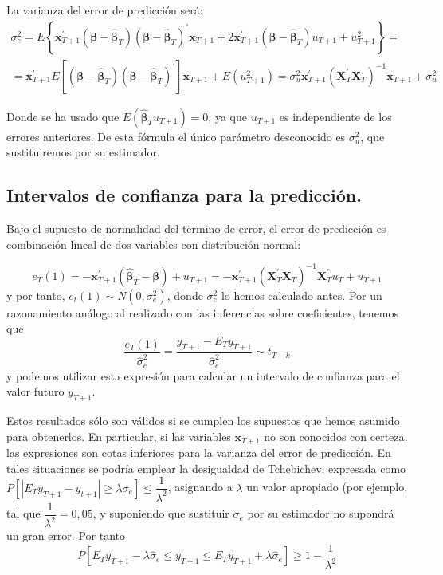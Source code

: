 La varianza del error de predicci\'on ser\'a: 
\[
\begin{array}{c}
\sigma_{e}^{2}=E\left\{ \boldsymbol{x}^{\prime}_{T+1}\left(\boldsymbol{\beta}-\hat{\boldsymbol{\beta}}_{T}\right)\left(\boldsymbol{\beta}-\hat{\boldsymbol{\beta}}_{T}\right)^{\prime}\boldsymbol{x}{}_{T+1}+2\boldsymbol{x}^{\prime}_{T+1}\left(\boldsymbol{\beta}-\hat{\boldsymbol{\beta}}_{T}\right)u_{T+1}+u_{T+1}^{2}\right\} =\\
=\boldsymbol{x}^{\prime}_{T+1}E\left[\left(\boldsymbol{\beta}-\hat{\boldsymbol{\beta}}_{T}\right)\left(\boldsymbol{\beta}-\hat{\boldsymbol{\beta}}_{T}\right)^{\prime}\right]\boldsymbol{x}{}_{T+1}+E\left(u_{T+1}^{2}\right)=\sigma_{u}^{2}\boldsymbol{x}^{\prime}_{T+1}\left(\boldsymbol{X}_{T}^{\prime}\boldsymbol{X}_{T}\right)^{-1}\boldsymbol{x}{}_{T+1}+\sigma_{u}^{2}
\end{array}
\]


Donde se ha usado que $E\left(\hat{\boldsymbol{\beta}}_{T}u_{T+1}\right)=0$,
ya que $u_{T+1}$ es independiente de los errores anteriores. De esta
f\'ormula el \'unico par\'ametro desconocido es $\sigma_{u}^{2}$, que sustituiremos
por su estimador.


\subsection{Intervalos de confianza para la predicci\'on.}

Bajo el supuesto de normalidad del t\'ermino de error, el error de predicci\'on
es combinaci\'on lineal de dos variables con distribuci\'on normal:

\[
e_{T}(1)=-\boldsymbol{x}^{\prime}_{T+1}\left(\hat{\boldsymbol{\beta}}_{T}-\boldsymbol{\beta}\right)+u_{T+1}=-\boldsymbol{x}^{\prime}_{T+1}\left(\boldsymbol{X}_{T}^{\prime}\boldsymbol{X}_{T}\right)^{-1}\boldsymbol{X}_{T}^{\prime}u_{T}+u_{T+1}
\]
 y por tanto, $e_{t}(1)\sim N(0,\sigma_{e}^{2})$, donde $\sigma_{e}^{2}$
lo hemos calculado antes. Por un razonamiento an\'alogo al realizado
con las inferencias sobre coeficientes, tenemos que 
\[
\dfrac{e_{T}(1)}{\hat{\sigma}_{e}^{2}}=\dfrac{y_{T+1}-E_{T}y_{T+1}}{\hat{\sigma}_{e}^{2}}\sim t_{T-k}
\]
 y podemos utilizar esta expresi\'on para calcular un intervalo de confianza
para el valor futuro $y_{T+1}$.

Estos resultados s\'olo son v\'alidos si se cumplen los supuestos que
hemos asumido para obtenerlos. En particular, si las variables $\boldsymbol{x}{}_{T+1}$
no son conocidos con certeza, las expresiones son cotas inferiores
para la varianza del error de predicci\'on. En tales situaciones se
podr\'ia emplear la desigualdad de Tchebichev, expresada como $P\left[\left|E_{T}y_{T+1}-y_{t+1}\right|\geq\lambda\sigma_{e}\right]\leq\dfrac{1}{\lambda^{2}}$,
asignando a $\lambda$ un valor apropiado (por ejemplo, tal que $\dfrac{1}{\lambda^{2}}=0,05$,
y suponiendo que sustituir $\sigma_{e}$ por su estimador no supondr\'a
un gran error. Por tanto 
\[
P\left[E_{T}y_{T+1}-\lambda\hat{\sigma}_{e}\leq y_{T+1}\leq E_{T}y_{T+1}+\lambda\hat{\sigma}_{e}\right]\geq1-\dfrac{1}{\lambda^{2}}
\]

